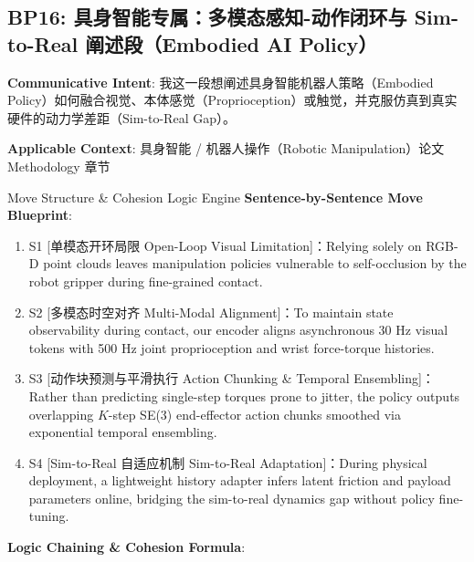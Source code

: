 \subsection{BP16: 具身智能专属：多模态感知-动作闭环与 Sim-to-Real 阐述段（Embodied AI Policy）}\label{sec:bp:BP16}
\noindent\textbf{\color{AcadNavy}Communicative Intent}: 我这一段想阐述具身智能机器人策略（Embodied Policy）如何融合视觉、本体感觉（Proprioception）或触觉，并克服仿真到真实硬件的动力学差距（Sim-to-Real Gap）。\par\vspace{2pt}
\noindent\textbf{\color{AcadSlate}Applicable Context}: 具身智能 / 机器人操作（Robotic Manipulation）论文 Methodology 章节\par\vspace{4pt}
\begin{ConceptBox}{Move Structure \& Cohesion Logic Engine}
\textbf{Sentence-by-Sentence Move Blueprint}:
\begin{enumerate}[label=\textbf{\color{AcadNavy}S\arabic*.}, leftmargin=2em, itemsep=2pt]
  \item S1 [单模态开环局限 Open-Loop Visual Limitation]：Relying solely on RGB-D point clouds leaves manipulation policies vulnerable to self-occlusion by the robot gripper during fine-grained contact.
  \item S2 [多模态时空对齐 Multi-Modal Alignment]：To maintain state observability during contact, our encoder aligns asynchronous 30 Hz visual tokens with 500 Hz joint proprioception and wrist force-torque histories.
  \item S3 [动作块预测与平滑执行 Action Chunking \& Temporal Ensembling]：Rather than predicting single-step torques prone to jitter, the policy outputs overlapping $K$-step SE(3) end-effector action chunks smoothed via exponential temporal ensembling.
  \item S4 [Sim-to-Real 自适应机制 Sim-to-Real Adaptation]：During physical deployment, a lightweight history adapter infers latent friction and payload parameters online, bridging the sim-to-real dynamics gap without policy fine-tuning.
\end{enumerate}\par\vspace{4pt}
\textbf{Logic Chaining \& Cohesion Formula}:\par{}
\end{ConceptBox}
